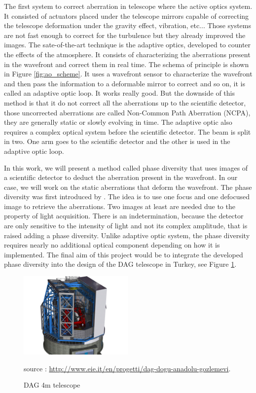 The first system to correct aberration in telescope where the active optics system. It consisted of actuators placed under the telescope mirrors capable of correcting the telescope deformation under the gravity effect, vibration, etc... Those systems are not fast enough to correct for the turbulence but they already improved the images. The sate-of-the-art technique is the adaptive optics, developed to counter the effects of the atmosphere. It consists of characterizing the aberrations present in the wavefront and correct them in real time. The schema of principle is shown in Figure \ref{fig:ao_scheme}. It uses a wavefront sensor to characterize the wavefront and then pass the information to a deformable mirror to correct and so on, it is called an adaptive optic loop. It works really good. But the downside of this method is that it do not correct all the aberrations up to the scientific detector, those uncorrected aberrations are called Non-Common Path Aberration (NCPA), they are generally static or slowly evolving in time. The adaptive optic also requires a complex optical system before the scientific detector. The beam is split in two. One arm goes to the scientific detector and the other is used in the adaptive optic loop.

In this work, we will present a method called phase diversity that uses images of a scientific detector to deduct the aberration present in the wavefront. In our case, we will work on the static aberrations that deform the wavefront. The phase diversity was first introduced by \citet{Gonsalves_1982}. The idea is to use one focus and one defocused image to retrieve the aberrations. Two images at least are needed due to the property of light acquisition. There is an indetermination, because the detector are only sensitive to the intensity of light and not its complex amplitude, that is raised adding a phase diversity. Unlike adaptive optic system, the phase diversity requires nearly no additional optical component depending on how it is implemented. The final aim of this project would be to integrate the developed phase diversity into the design of the DAG telescope in Turkey, see Figure \ref{fig:DAGtelescope}.

\begin{figure}
\begin{center}
\includegraphics[width=0.5\textwidth,angle=0]{Figures/DAGtelescope.jpg} \\
\caption{DAG 4m telescope} 
source : \url{http://www.eie.it/en/progetti/dag-dogu-anadolu-gozlemevi}.
\label{fig:DAGtelescope}
\end{center}
\end{figure}

